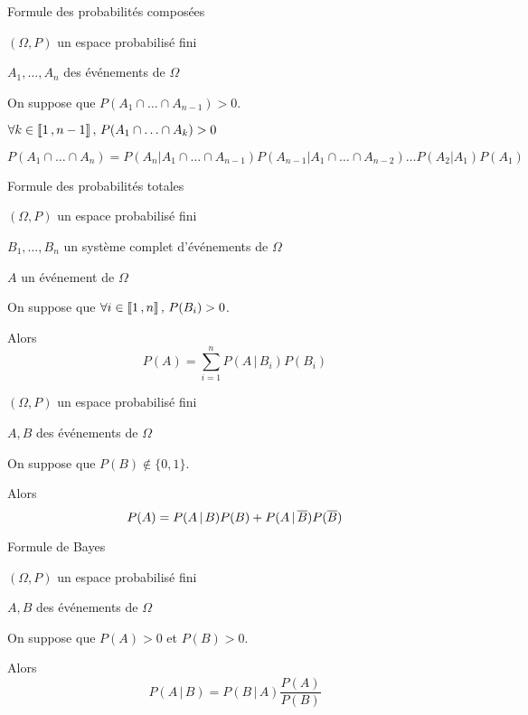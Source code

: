     \begin{theo}{Formule des probabilités composées}{}
        \begin{soient}
            \item $(\Omega,P)$ un espace probabilisé fini
            \item $A_1,\ldots,A_n$ des événements de $\Omega$
        \end{soient}
        On suppose que $P(A_1 \cap \ldots \cap A_{n-1}) > 0$.

        \begin{alors}
            \item $\forall k \in \left\llbracket 1 \, , n-1 \right\rrbracket, \, P(A_1 \cap \ldots \cap A_k) > 0$
            \item $ P(A_1 \cap \ldots \cap A_n) = P(A_n | A_1 \cap \ldots \cap A_{n-1})P(A_{n-1}|A_1 \cap \ldots \cap A_{n-2}) \ldots P(A_2|A_1)P(A_1) $
        \end{alors}
    \end{theo}

    \begin{theo}{Formule des probabilités totales}{}
        \begin{soient}
            \item $(\Omega,P)$ un espace probabilisé fini
            \item $B_1,\ldots,B_n$ un système complet d’événements de $\Omega$
            \item $A$ un événement de $\Omega$
        \end{soient}
        On suppose que $\forall i \in \left\llbracket 1 \, , n \right\rrbracket, \, P(B_i) > 0$.

        Alors 
        \[ P(A) = \sum\limits_{i=1}^n P(A\,|\,B_i)P(B_i) \]
    \end{theo}

    \begin{coro}{}{}
        \begin{soient}
            \item $(\Omega,P)$ un espace probabilisé fini
            \item $A,B$ des événements de $\Omega$
        \end{soient}
        On suppose que $P(B) \notin \{0,1\}$.

        Alors 
        \[ P(A) = P(A\,|\,B)P(B) + P(A\,|\,\overline{B})P(\overline{B}) \]
    \end{coro}

    \begin{theo}{Formule de Bayes}{}
        \begin{soient}
            \item $(\Omega,P)$ un espace probabilisé fini
            \item $A,B$ des événements de $\Omega$
        \end{soient}
        On suppose que $P(A) > 0$ et $P(B) > 0$.

        Alors 
        \[ P(A\,|\,B) = P(B\,|\,A)\frac{P(A)}{P(B)} \]
    \end{theo}

